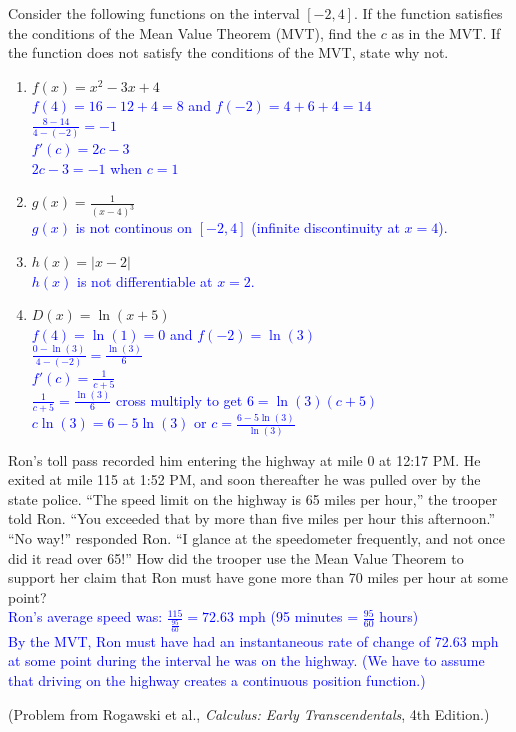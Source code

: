 \documentclass{ximera}
\begin{document}
\begin{exercise}
   Consider the following functions on the interval $[-2,4]$.  If the function satisfies the conditions of the Mean Value Theorem (MVT), find the $c$ as in the MVT.  If the function does not satisfy the conditions of the MVT, state why not.  
    \begin{enumerate}
       \item $f(x)=x^2-3x+4$\\
        \textcolor{blue}{ $f(4)=16-12+4=8$ and $f(-2)=4+6+4=14$\\
        $\frac{8-14}{4-(-2)}=-1$\\
        $f'(c)=2c-3$\\
        $2c-3=-1$ when $c=1$}
       \item $g(x)=\frac{1}{(x-4)^3}$\\
      \textcolor{blue}{ $g(x)$ is not continous on $[-2,4]$ (infinite discontinuity at $x=4$). }
       \item $h(x)=|x-2|$\\
      \textcolor{blue}{ $h(x)$ is not differentiable at $x=2$.}
       \item $D(x)=\ln(x+5)$\\
        \textcolor{blue}{ $f(4)=\ln(1)=0$ and $f(-2)=\ln(3)$\\
        $\frac{0-\ln(3)}{4-(-2)}=\frac{\ln(3)}{6}$\\
        $f'(c)=\frac{1}{c+5}$\\
        $\frac{1}{c+5}=\frac{\ln(3)}{6}$ cross multiply to get $6=\ln(3)(c+5)$\\
        $c\ln(3)=6-5\ln(3)$ or $c=\frac{6-5\ln(3)}{\ln(3)}$}
    \end{enumerate}

\end{exercise}

\begin{exercise}
   Ron’s toll pass recorded him entering the highway at mile 0 at 12:17 PM. He exited at mile 115 at 1:52 PM, and soon thereafter he was pulled over by the state police. “The speed limit on the highway is 65 miles per hour,” the trooper told Ron. “You exceeded that by more than five miles per hour this afternoon.” “No way!” responded Ron. “I glance at the speedometer frequently, and not once did it read over 65!” How did the trooper use the Mean Value Theorem to support her claim that Ron must have gone more than 70 miles per hour at some point? \\
   \textcolor{blue}{Ron's average speed was: $\frac{115}{\frac{95}{60}}=72.63$ mph (95 minutes = $\frac{95}{60}$ hours)\\
    By the MVT, Ron must have had an instantaneous rate of change of 72.63 mph at some point during the interval he was on the highway.  (We have to assume that driving on the highway creates a continuous position function.)}

(Problem from Rogawski et al., \textit{Calculus: Early Transcendentals}, 4th Edition.)
\end{exercise}
\end{document}
